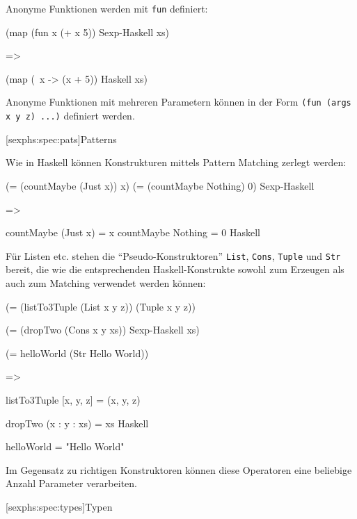 \documentclass[12pt, a4paper, bibgerm]{scrbook}
\newenvironment{DIFnomarkup}{}{}
\newcommand\icode[1]{\lstinline?#1?}
\newcommand\lsubsection{}
\begin{document}
Anonyme Funktionen werden mit \icode{fun} definiert:
\begin{DIFnomarkup}\begin{code}
(map 
  (fun x (+ x 5))           Sexp-Haskell
  xs)

=>

(map
  (\ x -> (x + 5))          Haskell
  xs)
\end{code}\end{DIFnomarkup}
Anonyme Funktionen mit mehreren Parametern können in der Form
\icode{(fun (args x y z) ...)} definiert werden.

\lsubsection[sexphs:spec:pats]{Patterns}

Wie in Haskell können Konstrukturen mittels Pattern Matching zerlegt
werden:
\begin{DIFnomarkup}\begin{code}
(= (countMaybe (Just x)) x)
(= (countMaybe Nothing)  0)      Sexp-Haskell

=>

countMaybe (Just x) = x
countMaybe Nothing  = 0          Haskell
\end{code}\end{DIFnomarkup}
Für Listen etc. stehen die ``Pseudo-Konstruktoren'' \icode{List},
\icode{Cons}, \icode{Tuple} und \icode{Str} bereit, die wie die
entsprechenden Haskell-Konstrukte sowohl zum Erzeugen als auch zum
Matching verwendet werden können:
\begin{DIFnomarkup}\begin{code}
(= (listTo3Tuple (List x y z)) 
   (Tuple x y z))

(= (dropTwo (Cons x y xs))             Sexp-Haskell
  xs)

(= helloWorld (Str Hello World))

=>

listTo3Tuple [x, y, z] = (x, y, z)

dropTwo (x : y : xs) = xs              Haskell

helloWorld = "Hello World"
\end{code}\end{DIFnomarkup}
Im Gegensatz zu richtigen Konstruktoren können diese Operatoren eine
beliebige Anzahl Parameter verarbeiten.

\lsubsection[sexphs:spec:types]{Typen}
\end{document}
